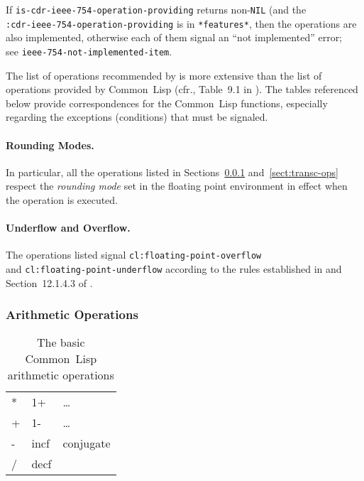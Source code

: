 \documentclass[10pt,fleqn]{article}
\newcommand{\CL}{\textsf{Common~Lisp}}
\newcommand{\code}[1]{\texttt{#1}}
\newcommand{\clieeeterm}[1]{\textit{#1}}
\begin{document}
If \code{is-cdr-ieee-754-operation-providing} returns non-\code{NIL}
(and the\\
\code{:cdr-ieee-754-operation-providing} is in
\code{*features*}, then the operations are also implemented, otherwise
each of them signal an ``not implemented'' error;\\
see \code{ieee-754-not-implemented-item}.

The list of operations
recommended by \cite{2008:IEEE-754} is more extensive than the list of
operations provided by \CL{} (cfr., Table~9.1 in \cite{2008:IEEE-754}).
%
The tables referenced below provide correspondences for the \CL{} functions,
especially regarding the exceptions (conditions) that must be
signaled.

\paragraph{Rounding Modes.} In particular, all the operations listed
in Sections~\ref{sect:arith-ops} and~\ref{sect:transc-ops} respect the
\clieeeterm{rounding mode} set in the floating point
environment in effect when the operation is executed.

\paragraph{Underflow and Overflow.}  The operations listed signal
\code{cl:floating-point-overflow}\\ and
\code{cl:floating-point-underflow} according to the rules established
in \cite{2008:IEEE-754} and Section~12.1.4.3 of \cite{1996:ANSIHyperSpec}.



\subsubsection{Arithmetic Operations}
\label{sect:arith-ops}

\begin{table}[h!]
  \centering
  \begin{tt}
    \begin{tabular}{lll}
      * & 1+ & \ldots \\
      + & 1- & \ldots \\
      - & incf & conjugate\\
      / & decf & \\
    \end{tabular}
  \end{tt}
  \caption{The basic \CL{} arithmetic operations}
  \label{table:cl-arit-ops}
\end{table}
\end{document}
